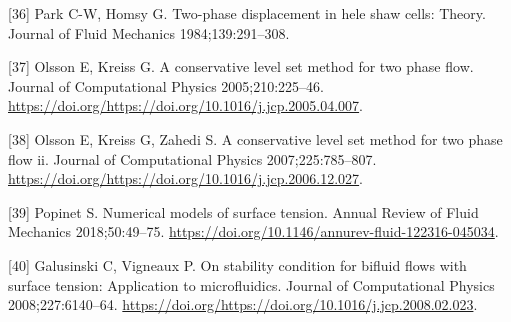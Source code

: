 \documentclass[]{article}
\begin{document}
\leavevmode\hypertarget{ref-park1984two}{}%
{[}36{]} Park C-W, Homsy G. Two-phase displacement in hele shaw cells:
Theory. Journal of Fluid Mechanics 1984;139:291--308.

\leavevmode\hypertarget{ref-Olsson2005}{}%
{[}37{]} Olsson E, Kreiss G. A conservative level set method for two
phase flow. Journal of Computational Physics 2005;210:225--46.
\url{https://doi.org/https://doi.org/10.1016/j.jcp.2005.04.007}.

\leavevmode\hypertarget{ref-Olsson2007}{}%
{[}38{]} Olsson E, Kreiss G, Zahedi S. A conservative level set method
for two phase flow ii. Journal of Computational Physics
2007;225:785--807.
\url{https://doi.org/https://doi.org/10.1016/j.jcp.2006.12.027}.

\leavevmode\hypertarget{ref-Popinet2018}{}%
{[}39{]} Popinet S. Numerical models of surface tension. Annual Review
of Fluid Mechanics 2018;50:49--75.
\url{https://doi.org/10.1146/annurev-fluid-122316-045034}.

\leavevmode\hypertarget{ref-Galusinski2008}{}%
{[}40{]} Galusinski C, Vigneaux P. On stability condition for bifluid
flows with surface tension: Application to microfluidics. Journal of
Computational Physics 2008;227:6140--64.
\url{https://doi.org/https://doi.org/10.1016/j.jcp.2008.02.023}.
\end{document}
